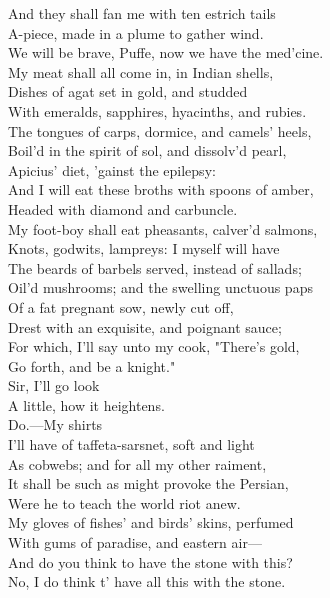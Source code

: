 \documentclass[a4paper,oneside]{memoir}
\begin{document}
\begin{drama*}
And they shall fan me with ten estrich tails\\
A-piece, made in a plume to gather wind.\\
We will be brave, Puffe, now we have the med'cine.\\
My meat shall all come in, in Indian shells,\\
Dishes of agat set in gold, and studded\\
With emeralds, sapphires, hyacinths, and rubies.\\
The tongues of carps, dormice, and camels' heels,\\
Boil'd in the spirit of sol, and dissolv'd pearl,\\
Apicius' diet, 'gainst the epilepsy:\\
And I will eat these broths with spoons of amber,\\
Headed with diamond and carbuncle.\\
My foot-boy shall eat pheasants, calver'd salmons,\\
Knots, godwits, lampreys: I myself will have\\
The beards of barbels served, instead of sallads;\\
Oil'd mushrooms; and the swelling unctuous paps\\
Of a fat pregnant sow, newly cut off,\\
Drest with an exquisite, and poignant sauce;\\
For which, I'll say unto my cook, "There's gold,\\
Go forth, and be a knight."\\
\facespeaks {} Sir, I'll go look\\
A little, how it heightens.\\
\mammonspeaks {} Do.---My shirts\\
I'll have of taffeta-sarsnet, soft and light\\
As cobwebs; and for all my other raiment,\\
It shall be such as might provoke the Persian,\\
Were he to teach the world riot anew.\\
My gloves of fishes' and birds' skins, perfumed\\
With gums of paradise, and eastern air---\\
\surlyspeaks And do you think to have the stone with this?\\
\mammonspeaks No, I do think t' have all this with the stone.\\

\end{drama*}
\end{document}
